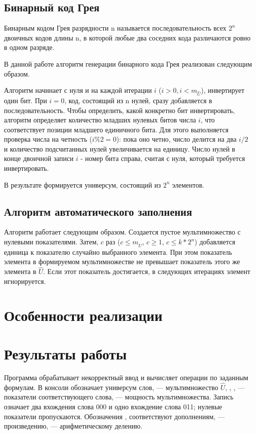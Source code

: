 \documentclass[14pt,a4paper]{extarticle}
\newcommand{\code}[1]{\texttt{\detokenize{#1}}}
\begin{document}
\subsection{Бинарный код Грея}

Бинарным кодом Грея разрядности n называется последовательность всех $2^n$ двоичных кодов длины n, в которой любые два соседних кода различаются ровно в одном разряде.

В данной работе алгоритм генерации бинарного кода Грея реализован следующим образом.

Алгоритм начинает с нуля и на каждой итерации $i$ ($i>0, i<m_{\hat{U}}$), инвертирует один бит. При $i=0$, код, состоящий из n нулей, сразу добавляется в последовательность. Чтобы определить, какой конкретно бит инвертировать, алгоритм определяет количество младших нулевых битов числа $i$, что соответствует позиции младшего единичного бита. Для этого выполняется проверка числа на четность ($i\%2=0$): пока оно четно, число делится на два $i/2$ и количество подсчитанных нулей увеличивается на единицу. Число нулей в конце двоичной записи $i$ - номер бита справа, считая с нуля, который требуется инвертировать.

В результате формируется универсум, состоящий из $2^n$ элементов.

\subsection{Алгоритм автоматического заполнения}

Алгоритм работает следующим образом. Создается пустое мультимножество с нулевыми показателями. Затем, $c$ раз ($c\leq m_{\hat{U}}$, $c\geq  1$, $c\leq k*2^n$) добавляется единица к показателю случайно выбранного элемента. При этом показатель элемента в формируемом мультимножестве не превышает показатель этого же элемента в $\hat{U}$. Если этот показатель достигается, в следующих итерациях элемент игнорируется.

\endgroup
\section{Особенности реализации}



\section{Результаты работы}

Программа обрабатывает некорректный ввод и вычисляет операции по заданным формулам. В консоли \code{U} обозначает универсум слов, \code{Û} — мультимножество $\hat U$, \code{a_Ui}, \code{a_Ai}, \code{a_Bi} — показатели соответствующего слова, \code{m_X} — мощность мультимножества. Запись \code{⟨2(000), 1(011)⟩} означает два вхождения слова 000 и одно вхождение слова 011; нулевые показатели пропускаются. Обозначения \code{¬A}, \code{¬B} соответствуют дополнениям, \code{A * B} — произведению, \code{A : B} — арифметическому делению.
\end{document}
